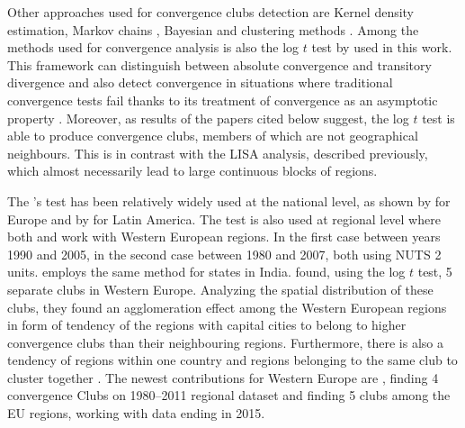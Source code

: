 \documentclass[11pt]{article}
\begin{document}
Other approaches used for convergence clubs detection are Kernel density estimation, Markov chains \citep{eckey2007convergence}, Bayesian \citep{fischer2015bayesian} and clustering methods \citep{maasoumi2008economic}. 
Among the methods used for convergence analysis is also the log $t$ test by \citet{phillips2007transition} used in this work. This framework can distinguish between absolute convergence and transitory divergence and also detect convergence in situations where traditional convergence tests fail thanks to its treatment of convergence as an asymptotic property \citep{bartkowska2012regional, borsi2015evolution}.
Moreover, as results of the papers cited below suggest, the log $t$ test is able to produce convergence clubs, members of which are not geographical neighbours. This is in contrast with the LISA analysis, described previously, which almost necessarily lead to large continuous blocks of regions.

The \cite{phillips2007transition}'s test
has been relatively widely used at the national level, as shown by \citet{borsi2015evolution, fritsche2011analysing, monfort2013real,apergis2010old} for Europe and by \citet{rodriguez2014there} for Latin America. The test is also used at regional level where both \citet{bartkowska2012regional} and \citet{pinho2010regional} work with Western European regions. In the first case between years 1990 and 2005, in the second case between 1980 and 2007, both using NUTS 2 units. \citet{ghosh2013regional} employs the same method for states in India. \citet{bartkowska2012regional} found, using the log $t$ test, 5 separate clubs in Western Europe. Analyzing the spatial distribution of these clubs, they found an agglomeration effect among the Western European regions in form of tendency of the regions with capital cities to belong to higher convergence clubs than their neighbouring regions. Furthermore, there is also a tendency of regions within one country and regions belonging to the same club to cluster together \citep{bartkowska2012regional}. The newest contributions for Western Europe are \citet{von2017regional}, finding 4 convergence Clubs on 1980–2011 regional dataset and \citet{cutrini2019economic} finding 5 clubs among the EU regions, working with data ending in 2015. 
\end{document}
